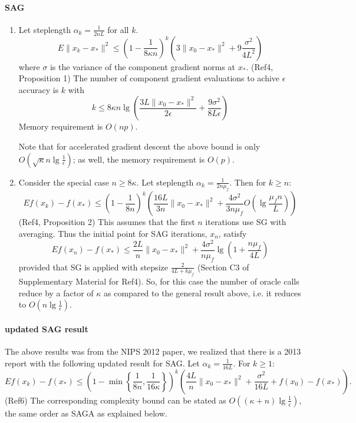 \documentclass{article}
\begin{document}
 \paragraph{SAG} 
 \begin{enumerate}
 \item Let steplength $\alpha_k=\displaystyle\frac{1}{2nL}$ for all $k$.  
 \[
  E\|x_k-x_\ast\|^2 \leq \left(1-\frac{1}{8\kappa n}\right)^k\left(3\|x_0-x_\ast\|^2+9\frac{\sigma^2}{4L^2}\right)
 \]
 where $\sigma$ is the variance of the component gradient norms at $x_\ast$.
(Ref4, Proposition 1)
 The number of component gradient evaluations to achive $\epsilon$ accuracy is $k$ with
 \[
  k\leq 8\kappa n \lg\left(\frac{3L\|x_0-x_\ast\|^2}{2\epsilon}+\frac{9\sigma^2}{8L\epsilon}\right)
 \]
Memory requirement is $O(np)$.
 
Note that for accelerated gradient descent the above bound is only $O(\sqrt{\kappa}n\lg\frac{1}{\epsilon})$; as well, the memory requirement is $O(p)$.

 \item Consider the special case $n\geq 8\kappa$. Let steplength $\alpha_k=\displaystyle\frac{1}{2n\mu_f}$. Then for $k\geq n$:
 \[
  Ef(x_k)-f(x_\ast) \leq \left(1-\frac{1}{8n}\right)^{k}\left(\frac{16L}{3n}\|x_0-x_\ast\|^2+\frac{4\sigma^2}{3n\mu_f} O\left(\lg\frac{\mu_f n}{L}\right)\right)
 \]
 (Ref4, Proposition 2)  This assumes that the first $n$ iterations use SG with averaging. Thus the initial point for SAG iterations, $x_n$, satisfy
 \[
  Ef(x_n)-f(x_\ast) \leq \frac{2L}{n}\|x_0-x_\ast\|^2 + \frac{4\sigma^2}{n\mu_f}\lg\left(1+\frac{n\mu_f}{4L}\right)
 \]
provided that SG is applied with stepsize $\displaystyle\frac{2}{4L+k\mu_f}$ (Section C3 of Supplementary Material for Ref4).  So, for this case the number of oracle calls reduce by a factor of $\kappa$ as compared to the general result above, i.e. it reduces to $O(n\lg \frac{1}{\epsilon})$.
 \end{enumerate}
  
 \paragraph{updated SAG result}  The above results was from the NIPS 2012 paper, we realized that there is a 2013 report with the following updated result for SAG.
 Let $\alpha_k=\displaystyle\frac{1}{16L}$. For $k\geq 1$:
 \[
  Ef(x_k)-f(x_\ast) \leq \left(1-\min\left\lbrace\frac{1}{8n},\frac{1}{16\kappa}\right\rbrace\right)^{k}\left(\frac{4L}{n}\|x_0-x_\ast\|^2+\frac{\sigma^2}{16L}+f(x_0)-f(x_\ast) \right).
 \]
(Ref6) The corresponding complexity bound can be stated as $O((\kappa+n)\lg\frac{1}{\epsilon})$, the same order as SAGA as explained below.
\end{document}
